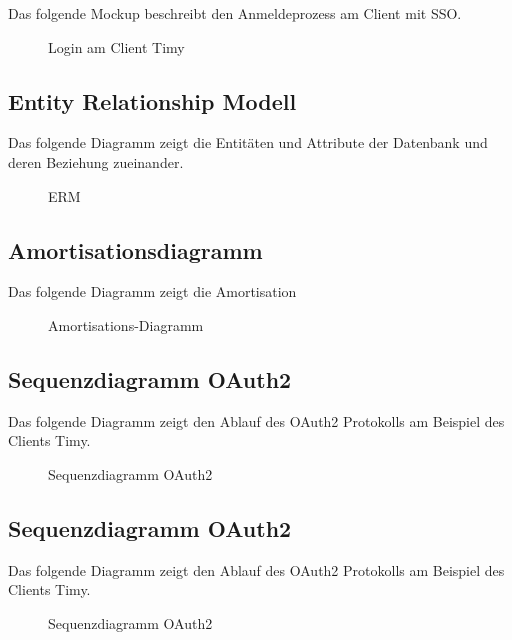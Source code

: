Das folgende Mockup beschreibt den Anmeldeprozess am Client mit \acs{SSO}.
\begin{figure}[htb]
\centering
{}
\caption{Login am Client Timy}
\end{figure}
\clearpage

\subsection{Entity Relationship Modell}
\label{app:ERM}
Das folgende Diagramm zeigt die Entitäten und Attribute der Datenbank und deren Beziehung zueinander.
\begin{figure}[htb]
\centering
{}
\caption{ERM}
\end{figure}
\clearpage

\subsection{Amortisationsdiagramm}
\label{app:Amortisationsdiagramm}
Das folgende Diagramm zeigt die Amortisation
\begin{figure}[htb]
\centering
{}
\caption{Amortisations-Diagramm}
\end{figure}
\clearpage

\subsection{Sequenzdiagramm OAuth2}
\label{app:sequenzdiagramm}
Das folgende Diagramm zeigt den Ablauf des OAuth2 Protokolls am Beispiel des Clients Timy.
\begin{figure}[htb]
\centering
{}
\caption{Sequenzdiagramm OAuth2}
\end{figure}
\clearpage

\subsection{Sequenzdiagramm OAuth2}
\label{app:sequenzdiagramm}
Das folgende Diagramm zeigt den Ablauf des OAuth2 Protokolls am Beispiel des Clients Timy.
\begin{figure}[htb]
\centering
{}
\caption{Sequenzdiagramm OAuth2}
\end{figure}
\clearpage


